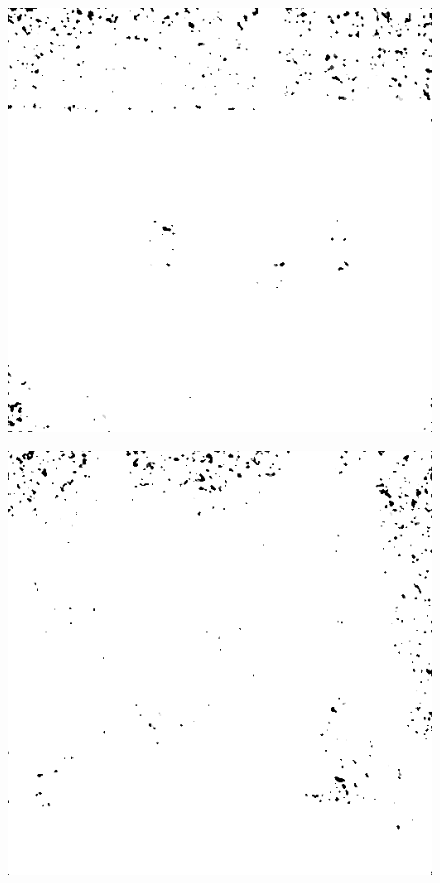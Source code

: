\begin{figure}[H]
\begin{minipage}[t]{0.3\linewidth}
	\label{fig:car_m25}
\end{minipage}
\begin{minipage}[t]{0.3\linewidth} %
	\includegraphics[width = 1\linewidth]{gfx/hus/hus_m25.png}
	\label{fig:hus_m25}
\end{minipage}
\begin{minipage}[t]{0.3\linewidth} %
	\includegraphics[width = 1\linewidth]{gfx/sit/sit_m25.png}

\end{minipage}
\end{figure}
